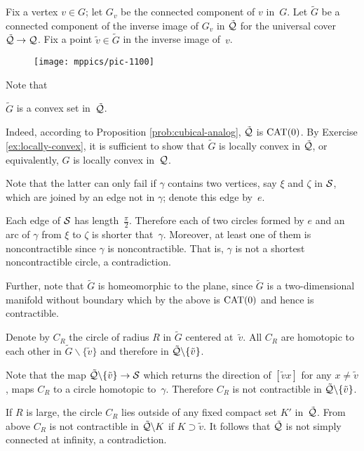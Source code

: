 Fix a vertex $v\in G$;
let $G_v$ be the connected component of $v$ in~$G$.
Let $\tilde G$ be a connected component of the inverse image of $G_v$ in $\tilde{\mathcal{Q}}$
for the universal cover $\tilde{\mathcal{Q}}\to \mathcal{Q}$.
Fix a point $\tilde v\in\tilde G$ in the inverse image of~$v$.

\begin{wrapfigure}{r}{25mm}
\vskip0mm
\centering
\texttt{[image: mppics/pic-1100]}
\end{wrapfigure}
 
Note that 
\begin{clm}{}\label{tilde-G-convex}
$\tilde G$ is a convex set in~$\tilde{\mathcal{Q}}$.
\end{clm}


Indeed, according to Proposition \ref{prob:cubical-analog},
$\tilde{\mathcal{Q}}$ is $\mathrm{CAT}(0)$.
By Exercise \ref{ex:locally-convex},
it is sufficient to show that $\tilde G$ is locally convex in $\tilde{\mathcal{Q}}$,
or equivalently, $G$ is locally convex in~$\mathcal{Q}$.

Note that the latter can only fail if $\gamma$ contains two vertices, say $\xi$ 
and 
$\zeta$ in $\mathcal{S}$,
which are joined by an edge not in $\gamma$; 
denote this edge by~$e$.

Each edge of $\mathcal{S}$ has length~$\tfrac\pi2$.
Therefore each of two circles formed by $e$ and an arc of $\gamma$
from $\xi$ to $\zeta$ is shorter that~$\gamma$.
Moreover,
at least one of them is noncontractible 
since $\gamma$ is 
noncontractible.
That is, 
$\gamma$ is not a shortest noncontractible circle, a contradiction.
\claimqeds

Further, note that 
$\tilde G$ is homeomorphic to the plane, 
since $\tilde G$ is 
a two-dimensional manifold without boundary which 
by the above is $\mathrm{CAT}(0)$ and hence is contractible.

Denote by $C_R$ the circle of radius $R$ in $\tilde G$ centered at~$\tilde v$.
All $C_R$ are homotopic to each other in $\tilde G\backslash\{\tilde v\}$ and therefore in $\tilde{\mathcal{Q}}\backslash \{\tilde v\}$.

Note that the map $\tilde{\mathcal{Q}}\backslash \{\tilde v\}\to \mathcal{S}$
which returns the direction of $[{\tilde v}{x}]$  for any $x\ne \tilde v$, maps $C_R$ to a circle homotopic to~$\gamma$.
Therefore $C_R$ is not contractible in $\tilde{\mathcal{Q}}\backslash \{\tilde v\}$.

If $R$ is large, 
the circle $C_R$  
lies outside of any fixed compact set $K'$ in~$\tilde{\mathcal{Q}}$.
From above $C_R$ is not contractible in $\tilde{\mathcal{Q}}\backslash K$
if $K\supset \tilde v$.
It follows that $\tilde{\mathcal{Q}}$ is not simply connected at infinity, a contradiction.
\qeds

